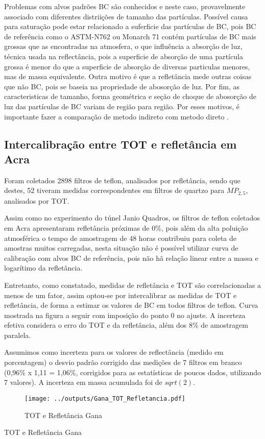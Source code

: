 Problemas com alvos padrões BC são conhecidos e neste caso, 
provavelmente associado com diferentes distriições de tamanho das partículas.
Possível causa para saturação pode estar relacionado a suferficie das partículas 
de BC, pois BC de referência como o ASTM-N762 ou Monarch 71 contém partículas
de BC mais grossas que as encontradas na atmosfera, o que influência a 
absorção de luz, técnica usada na reflectância, pois a superficie de absorção
de uma partícula grossa é menor do que a superficie de absorção de diversas
particulas menores, mas de massa equivalente. Outra motivo é que a refletância
mede outras coisas que não BC, pois se baseia na propriedade de abosorção de luz.
Por fim, as caracteristicas de tamanho, forma geométrica e seção de choque
de abosorção de luz das partículas de BC variam de região para região.
Por esses motivos, é importante fazer a comparação de metodo indireto com 
metodo direto \citep{quincey2007}.

\newpage
\subsection{Intercalibração entre TOT e refletância em Acra}

Foram coletados 2898 filtros de teflon, analisados por refletância,
sendo que destes, 52 tiveram medidas correspondentes em filtros de quartzo 
para $MP_{2,5}$, analisados por TOT.

Assim como no experimento do túnel Janio Quadros, os filtros de teflon 
coletados em Acra apresentaram refletância próximas de 0\%, pois além 
da alta poluição atmosférica o tempo de amostragem de 48 horas contribuiu 
para coleta de amostras muitos carregadas, nesta situação não é possível 
utilizar curva de calibração com alvos BC de referência, pois
não hã relação linear entre a massa e logarítimo da refletância.

Entretanto, como constatado, medidas de refletância e TOT são correlacionadas 
a menos de um fator, assim optou-se por intercalibrar as medidas de 
TOT e refletância, de forma a estimar os valores de BC em todos filtros
de teflon. Curva mostrada na figura a seguir com imposição do ponto 0 no ajuste.
A incerteza efetiva considera o erro do TOT e da refletância, além dos 8\% de 
amostragem paralela. 

Assumimos como incerteza para os valores de reflectância (medido em porcentagem)
o desvio padrão corrigido das medições de 7 filtros em branco 
(0,96\% x 1,11 = 1,06\%, corrigidos para as estatísticas de poucos dados, 
utilizando 7 valores). A incerteza em massa acumulada foi de $sqrt(2)$.

\begin{figure}[H]
\begin{center}
  \texttt{[image: ../outputs/Gana\_TOT\_Refletancia.pdf]}
  \caption{TOT e Refletância Gana}
\end{center}
\end{figure}

\begin{table}[H]
  \centering
  \small
   
   \caption{TOT e Refletância Gana}
\end{table} 


